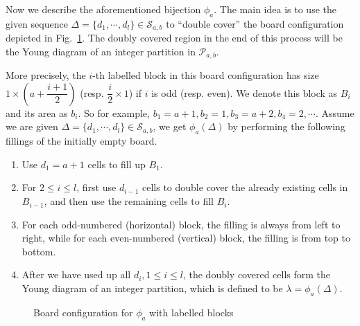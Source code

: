 \documentclass[12pt,reqno]{amsart}
\numberwithin{equation}{section}
\theoremstyle{plain}
\theoremstyle{definition}
\newcommand{\s}{\mathcal{S}}
\newcommand{\p}{\mathcal{P}}
\begin{document}
Now we describe the aforementioned bijection $\phi_a$. The main idea is to use the given sequence $\Delta=\{d_1,\cdots,d_l\}\in \s_{a,b}$ to ``double cover'' the board configuration depicted in Fig.~\ref{board}. The doubly covered region in the end of this process will be the Young diagram of an integer partition in $\p_{a,b}$.

More precisely, the $i$-th labelled block in this board configuration has size $1\times \left(a+\dfrac{i+1}{2}\right)$ (resp. $\dfrac{i}{2}\times 1$) if $i$ is odd (resp. even). We denote this block as $B_i$ and its area as $b_i$. So for example, $b_1=a+1,b_2=1,b_3=a+2,b_4=2,\cdots$. Assume we are given $\Delta=\{d_1,\cdots,d_l\}\in \s_{a,b}$, we get $\phi_a(\Delta)$ by performing the following fillings of the initially empty board.
\begin{enumerate}
\item Use $d_1=a+1$ cells to fill up $B_1$.
\item For $2\le i\le l$, first use $d_{i-1}$ cells to double cover the already existing cells in $B_{i-1}$, and then use the remaining cells to fill $B_i$.
\item For each odd-numbered (horizontal) block, the filling is always from left to right, while for each even-numbered (vertical) block, the filling is from top to bottom.
\item After we have used up all $d_i, 1\le i\le l$, the doubly covered cells form the Young diagram of an integer partition, which is defined to be $\lambda=\phi_a(\Delta)$.
\end{enumerate}

\begin{figure}
\caption{Board configuration for $\phi_a$ with labelled blocks}
\label{board}
\end{figure}
\end{document}
